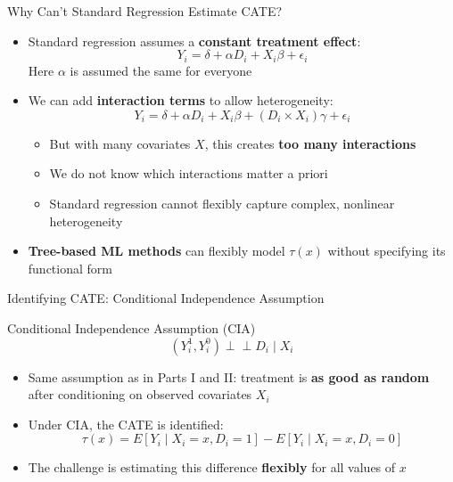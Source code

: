 \documentclass[hyperref={pdfpagelabels=false}]{beamer}
\newcommand{\indep}{\perp\!\!\!\perp}
\begin{document}
\begin{frame}{Why Can't Standard Regression Estimate CATE?}
	\begin{itemize}
		\item Standard regression assumes a \textbf{constant treatment effect}:
		\begin{equation*}
			Y_i = \delta + \alpha D_i + X_i \beta + \epsilon_i
		\end{equation*}
		Here $\alpha$ is assumed the same for everyone
		\vspace{0.3cm}
		\item We can add \textbf{interaction terms} to allow heterogeneity:
		\begin{equation*}
			Y_i = \delta + \alpha D_i + X_i \beta + (D_i \times X_i)\gamma + \epsilon_i
		\end{equation*}
		\vspace{0.2cm}
		\begin{itemize}
			\item But with many covariates $X$, this creates \textbf{too many interactions}
			\vspace{0.2cm}
			\item We do not know which interactions matter a priori
			\vspace{0.2cm}
			\item Standard regression cannot flexibly capture complex, nonlinear heterogeneity
		\end{itemize}
		\vspace{0.3cm}
		\item \textbf{Tree-based ML methods} can flexibly model $\tau(x)$ without specifying its functional form
	\end{itemize}
\end{frame}




\begin{frame}{Identifying CATE: Conditional Independence Assumption}
	\begin{block}{Conditional Independence Assumption (CIA)}
		\begin{equation*}
			(Y^{1}_{i}, Y^{0}_{i}) \indep D_{i} \mid X_{i}
		\end{equation*}
	\end{block}
	\begin{itemize}
		\vspace{0.3cm}
		\item Same assumption as in Parts I and II: treatment is \textbf{as good as random} after conditioning on observed covariates $X_i$
		\vspace{0.3cm}
		\item Under CIA, the CATE is identified:
		\begin{equation*}
			\tau(x) = E[Y_i \mid X_i = x, D_i = 1] - E[Y_i \mid X_i = x, D_i = 0]
		\end{equation*}
		\vspace{0.2cm}
		\item The challenge is estimating this difference \textbf{flexibly} for all values of $x$
	\end{itemize}
\end{frame}
\end{document}
